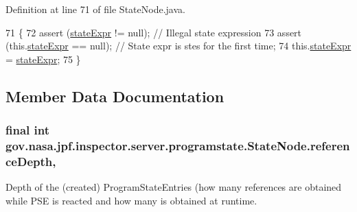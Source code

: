 Definition at line 71 of file State\+Node.\+java.


\begin{DoxyCode}
71                                                  \{
72     assert (\hyperlink{classgov_1_1nasa_1_1jpf_1_1inspector_1_1server_1_1programstate_1_1_state_node_a784a38d8edeb54f871891cb63de85585}{stateExpr} != null); \textcolor{comment}{// Illegal state expression}
73     assert (this.\hyperlink{classgov_1_1nasa_1_1jpf_1_1inspector_1_1server_1_1programstate_1_1_state_node_a784a38d8edeb54f871891cb63de85585}{stateExpr} == null); \textcolor{comment}{// State expr is stes for the first time;}
74     this.\hyperlink{classgov_1_1nasa_1_1jpf_1_1inspector_1_1server_1_1programstate_1_1_state_node_a784a38d8edeb54f871891cb63de85585}{stateExpr} = \hyperlink{classgov_1_1nasa_1_1jpf_1_1inspector_1_1server_1_1programstate_1_1_state_node_a784a38d8edeb54f871891cb63de85585}{stateExpr};
75   \}
\end{DoxyCode}


\subsection{Member Data Documentation}
\subsubsection[{\texorpdfstring{reference\+Depth}{referenceDepth}}]{\setlength{\rightskip}{0pt plus 5cm}final int gov.\+nasa.\+jpf.\+inspector.\+server.\+programstate.\+State\+Node.\+reference\+Depth\hspace{0.3cm}{\ttfamily [protected]}, {\ttfamily [inherited]}}\hypertarget{classgov_1_1nasa_1_1jpf_1_1inspector_1_1server_1_1programstate_1_1_state_node_a55683618625dae46e8aa68d95811d6bb}{}\label{classgov_1_1nasa_1_1jpf_1_1inspector_1_1server_1_1programstate_1_1_state_node_a55683618625dae46e8aa68d95811d6bb}


Depth of the (created) Program\+State\+Entries (how many references are obtained while P\+SE is reacted and how many is obtained at runtime. 



